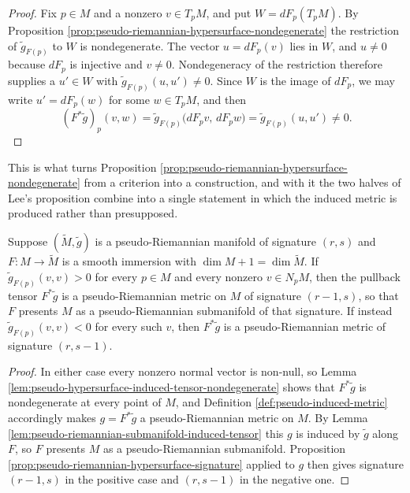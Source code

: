 \begin{proof}
\leanok
{}
Fix $p \in M$ and a nonzero $v \in T_pM$, and put $W = dF_p(T_pM)$. By Proposition \ref{prop:pseudo-riemannian-hypersurface-nondegenerate} the restriction of $\tilde{g}_{F(p)}$ to $W$ is nondegenerate. The vector $u = dF_p(v)$ lies in $W$, and $u \neq 0$ because $dF_p$ is injective and $v \neq 0$. Nondegeneracy of the restriction therefore supplies a $u' \in W$ with $\tilde{g}_{F(p)}(u,u') \neq 0$. Since $W$ is the image of $dF_p$, we may write $u' = dF_p(w)$ for some $w \in T_pM$, and then
\[
  (F^*\tilde{g})_p(v,w) = \tilde{g}_{F(p)}\bigl(dF_pv,\, dF_pw\bigr) = \tilde{g}_{F(p)}(u,u') \neq 0 .
\]
\end{proof}

This is what turns Proposition \ref{prop:pseudo-riemannian-hypersurface-nondegenerate} from a criterion into a construction, and with it the two halves of Lee's proposition combine into a single statement in which the induced metric is produced rather than presupposed.

\begin{corollary}
\label{cor:pseudo-riemannian-hypersurface-submanifold}
\leanok
{}
Suppose $(\tilde{M},\tilde{g})$ is a pseudo-Riemannian manifold of signature $(r,s)$ and $F : M \to \tilde{M}$ is a smooth immersion with $\dim M + 1 = \dim\tilde{M}$. If $\tilde{g}_{F(p)}(v,v) > 0$ for every $p \in M$ and every nonzero $v \in N_pM$, then the pullback tensor $F^*\tilde{g}$ is a pseudo-Riemannian metric on $M$ of signature $(r-1,s)$, so that $F$ presents $M$ as a pseudo-Riemannian submanifold of that signature. If instead $\tilde{g}_{F(p)}(v,v) < 0$ for every such $v$, then $F^*\tilde{g}$ is a pseudo-Riemannian metric of signature $(r,s-1)$.
\end{corollary}

\begin{proof}
\leanok
{}
In either case every nonzero normal vector is non-null, so Lemma \ref{lem:pseudo-hypersurface-induced-tensor-nondegenerate} shows that $F^*\tilde{g}$ is nondegenerate at every point of $M$, and Definition \ref{def:pseudo-induced-metric} accordingly makes $g = F^*\tilde{g}$ a pseudo-Riemannian metric on $M$. By Lemma \ref{lem:pseudo-riemannian-submanifold-induced-tensor} this $g$ is induced by $\tilde{g}$ along $F$, so $F$ presents $M$ as a pseudo-Riemannian submanifold. Proposition \ref{prop:pseudo-riemannian-hypersurface-signature} applied to $g$ then gives signature $(r-1,s)$ in the positive case and $(r,s-1)$ in the negative one.
\end{proof}

